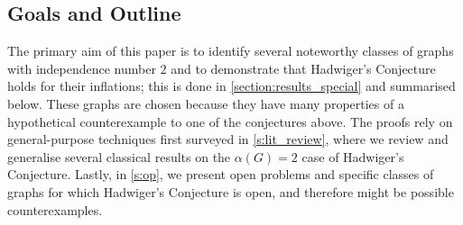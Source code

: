 \documentclass[11pt]{article}
\numberwithin{equation}{section}
\theoremstyle{plain}
\theoremstyle{definition}
\begin{document}
\subsection{Goals and Outline}
\label{ss:goals_outline}
The primary aim of this paper is to identify several noteworthy classes of graphs with independence number $2$ and to demonstrate that Hadwiger's Conjecture holds for their inflations; this is done in \cref{section:results_special} and summarised below. These graphs are chosen because they have many properties of a hypothetical counterexample to one of the conjectures above. The proofs rely on general-purpose techniques first surveyed in \cref{s:lit_review}, where we review and generalise several classical results on the $\alpha(G) = 2$ case of Hadwiger's Conjecture. Lastly, in \cref{s:op}, we present open problems and specific classes of graphs for which Hadwiger's Conjecture is open, and therefore might be possible counterexamples.
\end{document}
